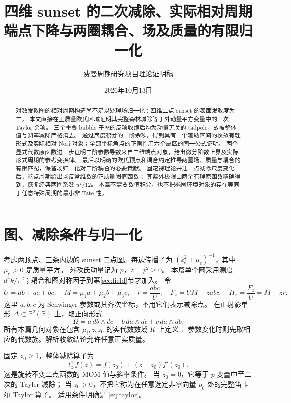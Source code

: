\documentclass[11pt,a4paper]{ctexart}
\title{四维 sunset 的二次减除、实际相对周期\\[4pt]
\large 端点下降与两圈耦合、场及质量的有限归一化}
\author{费曼周期研究项目\quad 理论证明稿}
\date{2026年10月13日}
\theoremstyle{cnplain}
\theoremstyle{remark}\newtheorem{remark}[theorem]{注}
\newcommand{\PP}{\mathbb P}
\begin{document}
\maketitle
\begin{abstract}
对数发散图的相对周期构造尚不足以处理场归一化：四维二点 sunset 的表面发散度为二。
本文直接在正质量欧氏区域证明其完整森林减除等于外动量平方变量中的一次 Taylor 余项。
三个重叠 bubble 子图的反项收缩后均为动量无关的 tadpole，故被整体值与斜率减除严格消去。
通过尺度积分的二阶余项，得到具有一个辅助区间的收敛有理形式及实际相对 Nori 对象；全部坐标角点的正则性用六个扇区的同一公式证明。
两个显式代数原函数进一步证明二阶参数导数来自二维端点对象，给出微分阶数上界及实际形式周期的参考变换律。
最后以明确的欧氏顶点和耦合约定推导两圈场、质量与耦合的有限匹配，保留场归一化对三阶耦合的必要贡献。
固定裸理论并让二点减除尺度变化后，端点周期给出场反常维数的正质量阈值函数；
其紫外极限由两个有理原函数精确得到，恢复经典两圈系数 $u^2/12$。
本篇不需要数值积分，也不把椭圆环境对象的存在等同于任意特殊周期的最小非 Tate 性。
\end{abstract}

\section{图、减除条件与归一化}
考虑两顶点、三条内边的 sunset 二点图。每边传播子为
$(k_e^2+\mu_e)^{-1}$，其中 $\mu_e>0$ 是质量平方。
外欧氏动量记为 $p$，$z=p^2\geq0$。
本篇单个圈采用测度 $d^4k/\pi^2$；耦合和图对称因子到第\ref{sec:field}节才加入。
令
\begin{equation}\label{eq:poly}
 U=ab+ac+bc,\quad M=\mu_1a+\mu_2b+\mu_3c,\quad
 r=\frac{abc}{U},\quad F_z=UM+zabc,\quad H_z=\frac{F_z}{U}=M+zr.
\end{equation}
这里 $a,b,c$ 为 Schwinger 参数或其齐次坐标，不用它们表示减除点。
在正射影单形 $\Delta\subset\PP^2(\mathbb R)$ 上，取正向形式
\[
 \Omega=a\,db\wedge dc-b\,da\wedge dc+c\,da\wedge db.
\]
所有本篇几何对象在包含 $\mu_i,z,z_0$ 的实代数数域 $K$ 上定义；
参数变化时则先取相应的代数族。解析收敛结论允许任意正实质量。

固定 $z_0\geq0$，整体减除算子为
\begin{equation}\label{eq:taylor}
 t_{z_0}^1 f(z)=f(z_0)+(z-z_0)f'(z_0).
\end{equation}
这是旋转不变二点函数的 MOM 值与斜率条件。
当 $z_0=0$，它等于 $p$ 变量中至二次的 Taylor 减除；
当 $z_0>0$，不把它称为在任意选定非零向量 $p_0$ 处的完整笛卡尔 Taylor 算子。
适用条件明确是 \eqref{eq:taylor}。
\end{document}
